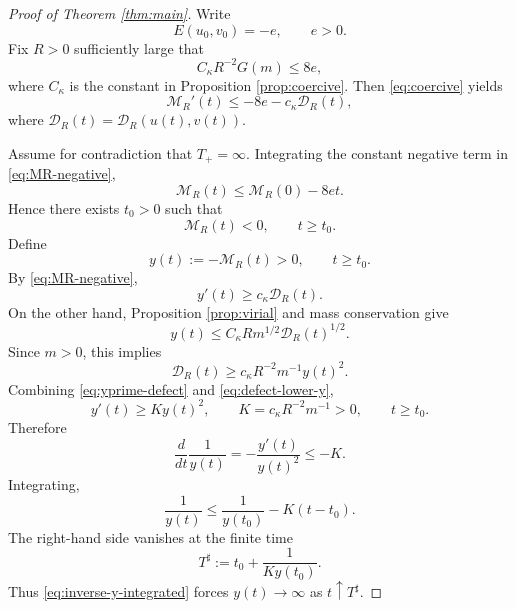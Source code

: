 \documentclass[12pt]{amsart}
\numberwithin{equation}{section}
\theoremstyle{remark}
\begin{document}
\begin{proof}[Proof of Theorem \ref{thm:main}]
Write
\begin{equation*}
 E(u_0,v_0)=-e, \qquad e>0.
\end{equation*}
Fix $R>0$ sufficiently large that
\begin{equation*}
 C_\kappa R^{-2}G(m)\le8e,
\end{equation*}
where $C_\kappa$ is the constant in Proposition \ref{prop:coercive}.  Then \eqref{eq:coercive} yields
\begin{equation}\label{eq:MR-negative}
 \mathcal M_R'(t)\le-8e-c_\kappa\mathcal D_R(t),
\end{equation}
where $\mathcal D_R(t)=\mathcal D_R(u(t),v(t))$.

Assume for contradiction that $T_+=\infty$.  Integrating the constant negative term in \eqref{eq:MR-negative},
\begin{equation*}
 \mathcal M_R(t)\le\mathcal M_R(0)-8et.
\end{equation*}
Hence there exists $t_0>0$ such that
\[
 \mathcal M_R(t)<0, \qquad t\ge t_0.
\]
Define
\begin{equation*}
 y(t):=-\mathcal M_R(t)>0,
 \qquad t\ge t_0.
\end{equation*}
By \eqref{eq:MR-negative},
\begin{equation}\label{eq:yprime-defect}
 y'(t)\ge c_\kappa\mathcal D_R(t).
\end{equation}
On the other hand, Proposition \ref{prop:virial} and mass conservation give
\[
 y(t)\le C_\kappa Rm^{1/2}\mathcal D_R(t)^{1/2}.
\]
Since $m>0$, this implies
\begin{equation}\label{eq:defect-lower-y}
 \mathcal D_R(t)\ge c_\kappa R^{-2}m^{-1}y(t)^2.
\end{equation}
Combining \eqref{eq:yprime-defect} and \eqref{eq:defect-lower-y},
\begin{equation*}
 y'(t)\ge K y(t)^2, \qquad K=c_\kappa R^{-2}m^{-1}>0,
 \qquad t\ge t_0.
\end{equation*}
Therefore
\begin{equation*}
 \frac{d}{dt}\frac1{y(t)}=-\frac{y'(t)}{y(t)^2}\le-K.
\end{equation*}
Integrating,
\begin{equation}\label{eq:inverse-y-integrated}
 \frac1{y(t)}\le\frac1{y(t_0)}-K(t-t_0).
\end{equation}
The right-hand side vanishes at the finite time
\begin{equation*}
 T^\sharp:=t_0+\frac1{K y(t_0)}.
\end{equation*}
Thus \eqref{eq:inverse-y-integrated} forces $y(t)\to\infty$ as $t\uparrow T^\sharp$.


\end{proof}
\end{document}

